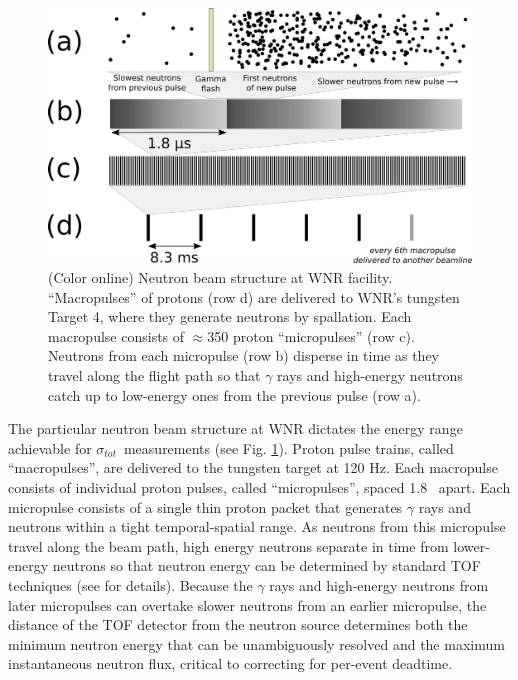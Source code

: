\documentclass[twocolumn,secnumarabic,amssymb, nobibnotes, aps, prl,
superscriptaddress, nobalancelastpage]{revtex4}
\newcommand{\tot}{\ensuremath{\sigma_{tot}}}
\begin{document}
\begin{figure}
    \includegraphics[width=\linewidth]{figures/beamStructure.png}
    \caption{(Color online) Neutron beam structure at WNR facility.
        ``Macropulses'' of protons (row d) are delivered to
        WNR's tungsten Target 4, where they generate neutrons by spallation.
        Each macropulse consists of
        $\approx$350 proton ``micropulses'' (row c). Neutrons
        from each micropulse (row b) disperse in
        time as they travel along the flight path so that $\gamma$ rays and high-energy 
    neutrons catch up to low-energy ones from the previous pulse (row a).}
    \label{BeamStructure}
\end{figure}

The particular neutron beam structure at WNR dictates the energy range
achievable for \tot\ measurements (see Fig. \ref{BeamStructure}).
Proton pulse trains, called ``macropulses'', are delivered to the tungsten target at 120 Hz.
Each macropulse consists of  individual proton pulses, called
``micropulses'', spaced 1.8 
\micro\second\ apart. Each micropulse consists of a single thin proton packet
that generates $\gamma$ rays and neutrons within a tight
temporal-spatial range. As neutrons from this micropulse travel along the beam path, 
high energy neutrons separate in time from lower-energy neutrons so that neutron
energy can be determined by standard TOF techniques (see \cite{Moore1980} for details).
Because the $\gamma$ rays and high-energy neutrons from later micropulses can
overtake slower neutrons from an earlier micropulse, the distance of the TOF
detector from the neutron source determines both the minimum neutron energy that can be 
unambiguously resolved and the maximum instantaneous neutron flux, critical to correcting
for per-event deadtime.
\end{document}
